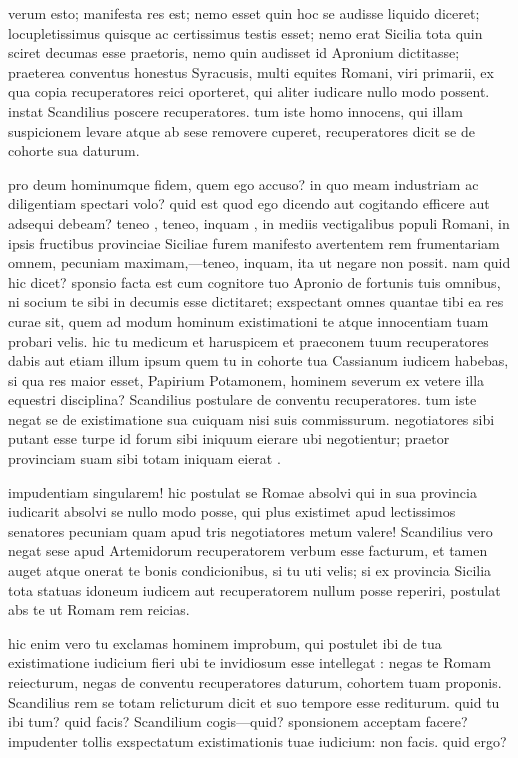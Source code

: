  verum esto; manifesta res est; nemo esset quin hoc se audisse liquido diceret; locupletissimus quisque ac certissimus testis esset; nemo erat Sicilia tota quin sciret decumas esse praetoris, nemo quin audisset id Apronium dictitasse; praeterea conventus honestus Syracusis, multi equites Romani, viri primarii, ex qua copia recuperatores reici oporteret, qui aliter iudicare nullo modo possent. instat Scandilius poscere recuperatores. tum iste homo innocens, qui illam suspicionem levare atque ab sese removere cuperet, recuperatores dicit se de cohorte sua daturum.

 pro deum hominumque fidem, quem ego accuso? in quo meam industriam ac diligentiam spectari volo? quid est quod ego dicendo aut cogitando efficere aut adsequi debeam? teneo , teneo, inquam , in mediis vectigalibus populi Romani, in ipsis fructibus provinciae Siciliae furem manifesto avertentem rem frumentariam omnem, pecuniam maximam,—teneo, inquam, ita ut negare non possit. nam quid hic dicet? sponsio facta est cum cognitore tuo Apronio de fortunis tuis omnibus, ni socium te sibi in decumis esse dictitaret; exspectant omnes quantae tibi ea res curae sit, quem ad modum hominum existimationi te atque innocentiam tuam probari velis. hic tu medicum et haruspicem et praeconem tuum recuperatores dabis aut etiam illum ipsum quem tu in cohorte tua Cassianum iudicem habebas, si qua res maior esset, Papirium Potamonem, hominem severum ex vetere illa equestri disciplina? Scandilius postulare de conventu recuperatores. tum iste negat se de existimatione sua cuiquam nisi suis commissurum. negotiatores sibi putant esse turpe id forum sibi iniquum eierare ubi negotientur; praetor provinciam suam sibi totam iniquam eierat .

 impudentiam singularem! hic postulat se Romae absolvi qui in sua provincia iudicarit absolvi se nullo modo posse, qui plus existimet apud lectissimos senatores pecuniam quam apud tris negotiatores metum valere! Scandilius vero negat sese apud Artemidorum recuperatorem verbum esse facturum, et tamen auget atque onerat te bonis condicionibus, si tu uti velis; si ex provincia Sicilia tota statuas idoneum iudicem aut recuperatorem nullum posse reperiri, postulat abs te ut Romam rem reicias.

 hic enim vero tu exclamas hominem improbum, qui postulet ibi de tua existimatione iudicium fieri ubi te invidiosum esse intellegat : negas te Romam reiecturum, negas de conventu recuperatores daturum, cohortem tuam proponis. Scandilius rem se totam relicturum dicit et suo tempore esse rediturum. quid tu ibi tum? quid facis? Scandilium cogis—quid? sponsionem acceptam facere? impudenter tollis exspectatum existimationis tuae iudicium: non facis. quid ergo?

